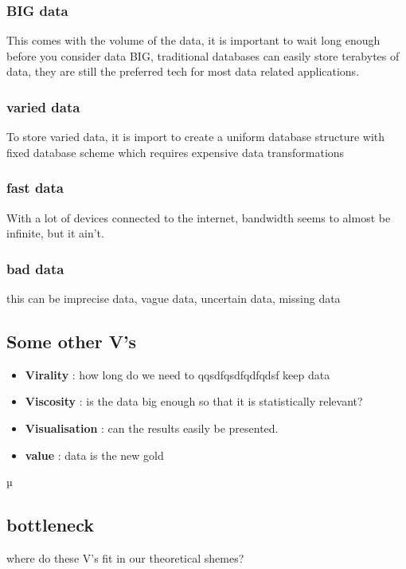 \documentclass{report}
\begin{document}
			\subsubsection{BIG data}
				This comes with the volume of the data, it is important to wait long enough before you consider data BIG, traditional databases can easily store terabytes of data, they are still the preferred tech for most data related applications.
			\subsubsection{varied data}
				To store varied data, it is import to create a uniform database structure with fixed database scheme which requires expensive data transformations
			\subsubsection{fast data}
				With a lot of devices connected to the internet, bandwidth seems to almost be infinite, but it ain't.
			\subsubsection{bad data}
				this can be imprecise data, vague data, uncertain data, missing data
			\subsection{Some other V's}
				\begin{itemize}
					\item \textbf{Virality} : how long do we need to 
		qqsdfqsdfqdfqdsf			
					keep data
					\item \textbf{Viscosity} : is the data big enough so that it is statistically relevant?
					\item \textbf{Visualisation} : can the results easily be presented.
					\item \textbf{value} : data is the new gold
				\end{itemize}µ
			\subsection{bottleneck}
				where do these V's fit in our theoretical shemes?
\end{document}

